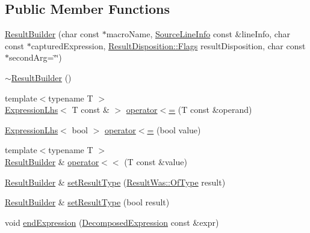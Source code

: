 \subsection*{Public Member Functions}
\begin{DoxyCompactItemize}
\item 
\mbox{\hyperlink{class_catch_1_1_result_builder_a8579c3056f64f9324cf1181532828376}{Result\+Builder}} (char const $\ast$macro\+Name, \mbox{\hyperlink{struct_catch_1_1_source_line_info}{Source\+Line\+Info}} const \&line\+Info, char const $\ast$captured\+Expression, \mbox{\hyperlink{struct_catch_1_1_result_disposition_a3396cad6e2259af326b3aae93e23e9d8}{Result\+Disposition\+::\+Flags}} result\+Disposition, char const $\ast$second\+Arg=\char`\"{}\char`\"{})
\item 
\mbox{\hyperlink{class_catch_1_1_result_builder_a687d1e9521d97f93c883ab070cc94c64}{$\sim$\+Result\+Builder}} ()
\item 
{\footnotesize template$<$typename T $>$ }\\\mbox{\hyperlink{class_catch_1_1_expression_lhs}{Expression\+Lhs}}$<$ T const  \& $>$ \mbox{\hyperlink{class_catch_1_1_result_builder_ad76939f5a52fcb534f97b49a0b7bc560}{operator$<$=}} (T const \&operand)
\item 
\mbox{\hyperlink{class_catch_1_1_expression_lhs}{Expression\+Lhs}}$<$ bool $>$ \mbox{\hyperlink{class_catch_1_1_result_builder_a3b87b20bcd1ef9e630880e59eeefba2a}{operator$<$=}} (bool value)
\item 
{\footnotesize template$<$typename T $>$ }\\\mbox{\hyperlink{class_catch_1_1_result_builder}{Result\+Builder}} \& \mbox{\hyperlink{class_catch_1_1_result_builder_a5aa79ce6160ab8cd800eb65bbd7a28a4}{operator$<$$<$}} (T const \&value)
\item 
\mbox{\hyperlink{class_catch_1_1_result_builder}{Result\+Builder}} \& \mbox{\hyperlink{class_catch_1_1_result_builder_af896e372db9d7fc90ddeceff3ad110d0}{set\+Result\+Type}} (\mbox{\hyperlink{struct_catch_1_1_result_was_a624e1ee3661fcf6094ceef1f654601ef}{Result\+Was\+::\+Of\+Type}} result)
\item 
\mbox{\hyperlink{class_catch_1_1_result_builder}{Result\+Builder}} \& \mbox{\hyperlink{class_catch_1_1_result_builder_ae504348b073d0360bfd5fc33347ec689}{set\+Result\+Type}} (bool result)
\item 
void \mbox{\hyperlink{class_catch_1_1_result_builder_a864e03b7300271de7cc44b9864463c5a}{end\+Expression}} (\mbox{\hyperlink{struct_catch_1_1_decomposed_expression}{Decomposed\+Expression}} const \&expr)

\end{DoxyCompactItemize}

